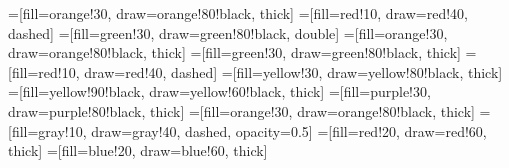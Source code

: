 
=[fill=orange!30, draw=orange!80!black, thick]
=[fill=red!10, draw=red!40, dashed]
=[fill=green!30, draw=green!80!black, double]
=[fill=orange!30, draw=orange!80!black, thick]
=[fill=green!30, draw=green!80!black, thick]
=[fill=red!10, draw=red!40, dashed]
=[fill=yellow!30, draw=yellow!80!black, thick]
=[fill=yellow!90!black, draw=yellow!60!black, thick]
=[fill=purple!30, draw=purple!80!black, thick]
=[fill=orange!30, draw=orange!80!black, thick]
=[fill=gray!10, draw=gray!40, dashed, opacity=0.5]
=[fill=red!20, draw=red!60, thick]
=[fill=blue!20, draw=blue!60, thick]
